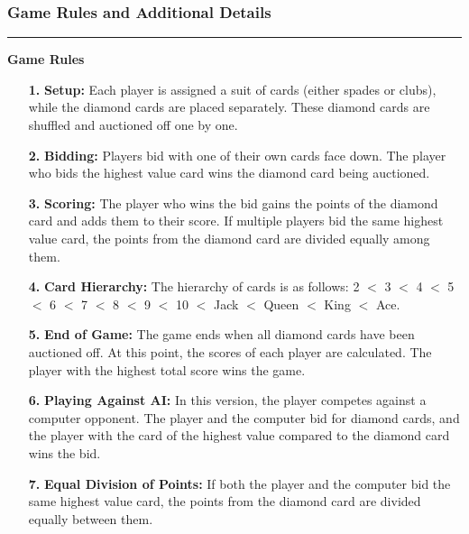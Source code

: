 \documentclass{article}
\begin{document}
\newpage
\begin{frame}
\frametitle{\LARGE Game Rules and Additional Details}
\vspace{0.5cm}
\centering
\textcolor{gray}{\rule{\linewidth}{0.5pt}}
{\centering\textbf{\LARGE Game Rules}\par}

\raggedright %
\Large
\begin{enumerate}
    \item[\textbf{1.}] \textbf{Setup:} Each player is assigned a suit of cards (either spades or clubs), while the diamond cards are placed separately. These diamond cards are shuffled and auctioned off one by one.
    \item[\textbf{2.}] \textbf{Bidding:} Players bid with one of their own cards face down. The player who bids the highest value card wins the diamond card being auctioned.
    \item[\textbf{3.}] \textbf{Scoring:} The player who wins the bid gains the points of the diamond card and adds them to their score. If multiple players bid the same highest value card, the points from the diamond card are divided equally among them.
    \item[\textbf{4.}] \textbf{Card Hierarchy:} The hierarchy of cards is as follows: 2 $<$ 3 $<$ 4 $<$ 5 $<$ 6 $<$ 7 $<$ 8 $<$ 9 $<$ 10 $<$ Jack $<$ Queen $<$ King $<$ Ace.
    \item[\textbf{5.}] \textbf{End of Game:} The game ends when all diamond cards have been auctioned off. At this point, the scores of each player are calculated. The player with the highest total score wins the game.
    \item[\textbf{6.}] \textbf{Playing Against AI:} In this version, the player competes against a computer opponent. The player and the computer bid for diamond cards, and the player with the card of the highest value compared to the diamond card wins the bid.
    \item[\textbf{7.}] \textbf{Equal Division of Points:} If both the player and the computer bid the same highest value card, the points from the diamond card are divided equally between them.
\end{enumerate}
\end{frame}
\end{document}
